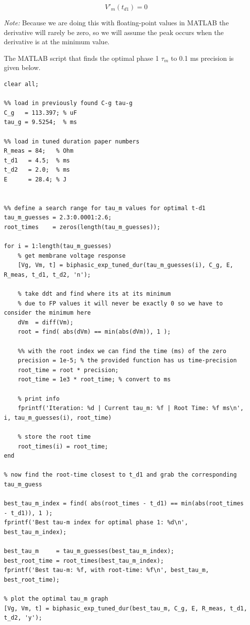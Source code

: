 \documentclass[]{report}
\begin{document}
\[
V'_m(t_{d1}) = 0
\]


\textit{Note:} Because we are doing this with floating-point values in MATLAB the derivative will rarely be zero, so we will assume the peak occurs when the derivative is at the minimum value.

The MATLAB script that finds the optimal phase 1 $\tau_m$ to 0.1 ms precision is given below. \newpage

\begin{lstlisting}[style=Matlab-editor, backgroundcolor=\color{smoky}, basicstyle=\ttfamily\tiny]
clear all;

%% load in previously found C-g tau-g
C_g   = 113.397; % uF
tau_g = 9.5254;  % ms

%% load in tuned duration paper numbers
R_meas = 84;   % Ohm
t_d1   = 4.5;  % ms
t_d2   = 2.0;  % ms
E      = 28.4; % J


%% define a search range for tau_m values for optimal t-d1
tau_m_guesses = 2.3:0.0001:2.6;
root_times    = zeros(length(tau_m_guesses));

for i = 1:length(tau_m_guesses)
	% get membrane voltage response
	[Vg, Vm, t] = biphasic_exp_tuned_dur(tau_m_guesses(i), C_g, E, R_meas, t_d1, t_d2, 'n');
	
	% take ddt and find where its at its minimum
	% due to FP values it will never be exactly 0 so we have to consider the minimum here
	dVm  = diff(Vm);
	root = find( abs(dVm) == min(abs(dVm)), 1 );
	
	%% with the root index we can find the time (ms) of the zero
	precision = 1e-5; % the provided function has us time-precision
	root_time = root * precision;
	root_time = 1e3 * root_time; % convert to ms
	
	% print info
	fprintf('Iteration: %d | Current tau_m: %f | Root Time: %f ms\n', i, tau_m_guesses(i), root_time)
	
	% store the root time
	root_times(i) = root_time;
end

% now find the root-time closest to t_d1 and grab the corresponding tau_m_guess

best_tau_m_index = find( abs(root_times - t_d1) == min(abs(root_times - t_d1)), 1 );
fprintf('Best tau-m index for optimal phase 1: %d\n', best_tau_m_index);

best_tau_m     = tau_m_guesses(best_tau_m_index);
best_root_time = root_times(best_tau_m_index);
fprintf('Best tau-m: %f, with root-time: %f\n', best_tau_m, best_root_time);

% plot the optimal tau_m graph 
[Vg, Vm, t] = biphasic_exp_tuned_dur(best_tau_m, C_g, E, R_meas, t_d1, t_d2, 'y');
\end{lstlisting}
\end{document}
